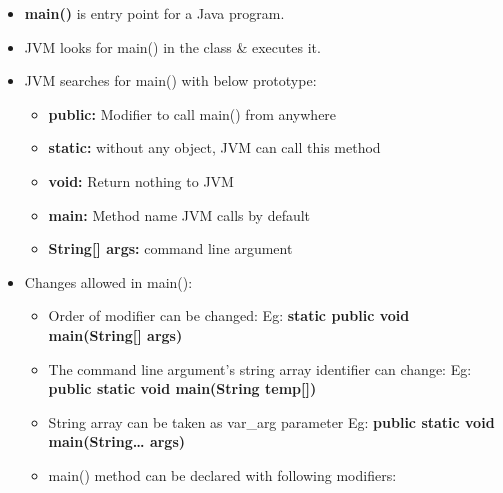 

\begin{flushleft}
	
	\begin{itemize}
		\item \textbf{main()} is entry point for a Java program. 
		\item JVM looks for main() in the class \& executes it.
		\item JVM searches for main() with below prototype:
		\bigskip
	
		\begin{itemize}
			\item \textbf{public:} Modifier to call main() from anywhere
			\item \textbf{static:} without any object, JVM can call this method
			\item \textbf{void:} Return nothing to JVM
			\item \textbf{main:} Method name JVM calls by default
			\item \textbf{String[] args:} command line argument
		\end{itemize}
		\bigskip
		\item Changes allowed in main():
		\begin{itemize}
			\item Order of modifier can be changed:
			\newline
			Eg: \textbf{static public void main(String[] args)}
			\item The command line argument’s string array identifier can change:
			\newline
			Eg: \textbf{public static void main(String temp[])}
			\item String array can be taken as var\_arg parameter
			\newline
			Eg: \textbf{public static void main(String… args)}
			\item main() method can be declared with following modifiers:

\end{itemize}
\end{itemize}
\end{flushleft}
